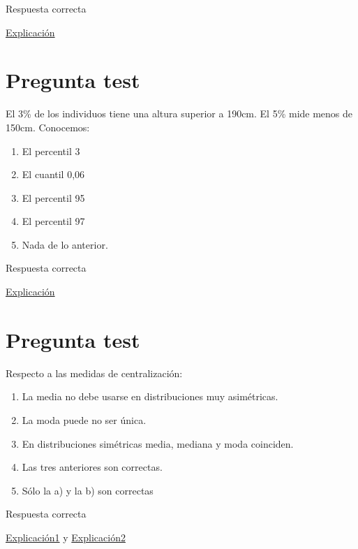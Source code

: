 \documentclass[
]{book}
\providecommand{\tightlist}{%
  \setlength{\itemsep}{0pt}\setlength{\parskip}{0pt}}
\begin{document}
Respuesta correcta

\href{https://1fjmanzano.github.io/bioestadistica/tablas-de-frecuencias.html}{Explicación}

\hypertarget{pregunta-test-83}{%
\section{Pregunta test}\label{pregunta-test-83}}

El 3\% de los individuos tiene una altura superior a 190cm. El 5\% mide menos de 150cm. Conocemos:

\begin{enumerate}
\def\labelenumi{\alph{enumi})}
\tightlist
\item
  El percentil 3
\item
  El cuantil 0,06
\item
  El percentil 95
\item
  El percentil 97
\item
  Nada de lo anterior.
\end{enumerate}

Respuesta correcta

\href{https://1fjmanzano.github.io/bioestadistica/medidas-de-posicio\%CC\%81n-dispersio\%CC\%81n-y-forma.html\#medidas-de-posicio\%CC\%81n-no-centrales}{Explicación}

\hypertarget{pregunta-test-84}{%
\section{Pregunta test}\label{pregunta-test-84}}

Respecto a las medidas de centralización:

\begin{enumerate}
\def\labelenumi{\alph{enumi})}
\tightlist
\item
  La media no debe usarse en distribuciones muy asimétricas.
\item
  La moda puede no ser única.
\item
  En distribuciones simétricas media, mediana y moda coinciden.
\item
  Las tres anteriores son correctas.
\item
  Sólo la a) y la b) son correctas
\end{enumerate}

Respuesta correcta

\href{https://1fjmanzano.github.io/bioestadistica/medidas-de-forma.html}{Explicación1} y \href{https://www.statisticshowto.com/what-is-a-bimodal-distribution/}{Explicación2}
\end{document}
